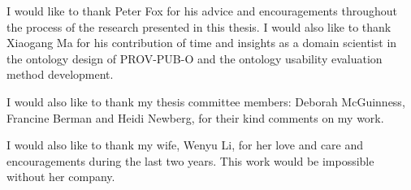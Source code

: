  

I would like to thank Peter Fox for his advice and encouragements throughout the process of the research presented in this thesis. I would also like to thank Xiaogang Ma for his contribution of time and insights as a domain scientist in the ontology design of PROV-PUB-O and the ontology usability evaluation method development.

I would also like to thank my thesis committee members: Deborah McGuinness, Francine Berman and Heidi Newberg, for their kind comments on my work.

I would also like to thank my wife, Wenyu Li, for her love and care and encouragements during the last two years. This work would be impossible without her company.


